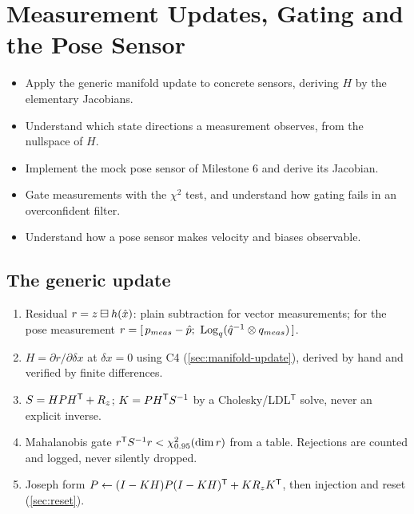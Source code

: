 \chapter{Measurement Updates, Gating and the Pose Sensor}
\label{ch:updates}

\begin{objectives}
\begin{itemize}
  \item Apply the generic manifold update to concrete sensors, deriving $H$ by the elementary Jacobians.
  \item Understand which state directions a measurement observes, from the nullspace of $H$.
  \item Implement the mock pose sensor of Milestone 6 and derive its Jacobian.
  \item Gate measurements with the $\chi^2$ test, and understand how gating fails in an overconfident filter.
  \item Understand how a pose sensor makes velocity and biases observable.
\end{itemize}
\end{objectives}

\section{The generic update}

\begin{convention}
\begin{enumerate}
  \item Residual $r = z\boxminus h(\hat x)$: plain subtraction for vector measurements; for the pose measurement
        $r = [\,p_{meas} - \hat p;\ \Log_q(\hat q\inv\qprod q_{meas})\,]$.
  \item $H = \partial r/\partial\delta x$ at $\delta x = 0$ using C4 (\cref{sec:manifold-update}), derived by hand and verified by
        finite differences.
  \item $S = HPH^{\mathsf{T}} + R_z$; $K = PH^{\mathsf{T}} S^{-1}$ by a Cholesky/LDL$^\mathsf{T}$ solve, never an explicit inverse.
  \item Mahalanobis gate $r^{\mathsf{T}} S^{-1} r < \chi^2_{0.95}(\dim r)$ from a  table. Rejections are counted and
        logged, never silently dropped.
  \item Joseph form $P \gets (I - KH)P(I - KH)^{\mathsf{T}} + KR_zK^{\mathsf{T}}$, then injection and reset (\cref{sec:reset}).
\end{enumerate}
\end{convention}

